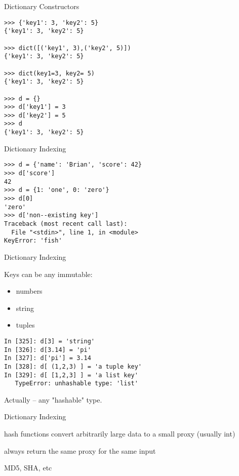 \documentclass{beamer}
\begin{document}
\begin{frame}[fragile]{Dictionary Constructors}

\begin{verbatim}
>>> {'key1': 3, 'key2': 5}
{'key1': 3, 'key2': 5}

>>> dict([('key1', 3),('key2', 5)])
{'key1': 3, 'key2': 5}

>>> dict(key1=3, key2= 5)
{'key1': 3, 'key2': 5}

>>> d = {}
>>> d['key1'] = 3
>>> d['key2'] = 5
>>> d
{'key1': 3, 'key2': 5}
\end{verbatim}

\end{frame} 

\begin{frame}[fragile]{Dictionary Indexing}

\begin{verbatim}
>>> d = {'name': 'Brian', 'score': 42}
>>> d['score']
42
>>> d = {1: 'one', 0: 'zero'}
>>> d[0]
'zero'
>>> d['non-­‐existing key']
Traceback (most recent call last):
  File "<stdin>", line 1, in <module>
KeyError: 'fish'
\end{verbatim}

\end{frame} 

\begin{frame}[fragile]{Dictionary Indexing}

{\Large Keys can be any immutable:}
\begin{itemize}
  \item numbers
  \item string
  \item tuples
\end{itemize}

\begin{verbatim}
In [325]: d[3] = 'string'
In [326]: d[3.14] = 'pi'
In [327]: d['pi'] = 3.14
In [328]: d[ (1,2,3) ] = 'a tuple key'
In [329]: d[ [1,2,3] ] = 'a list key'
   TypeError: unhashable type: 'list'
\end{verbatim}

\vfill
Actually -- any "hashable" type.
\end{frame} 

\begin{frame}[fragile]{Dictionary Indexing}

\vfill
{\Large hash functions convert arbitrarily large data to a small proxy (usually int)

\vfill
always return the same proxy for the same input

\vfill
MD5, SHA, etc
\vfill
}
\end{frame} 
\end{document}
